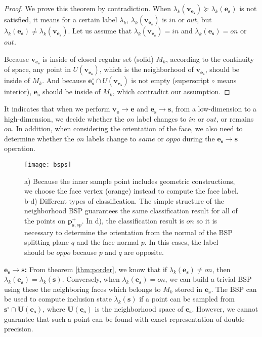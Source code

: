 \begin{proof}
We prove this theorem by contradiction. When $\lambda_k(\bm{v}_{\bm{e}_{\bm{s}}}) \succeq \lambda_k(\bm{e}_{\bm{s}})$ is not satisfied, it means for a certain label $\lambda_k$, $\lambda_k(\bm{v}_{\bm{e}_{\bm{s}}})$ is $in$ or $out$, but $\lambda_k(\bm{e}_{\bm{s}}) \neq \lambda_k(\bm{v}_{\bm{e}_{\bm{s}}})$.
Let us assume that $\lambda_k(\bm{v}_{\bm{e}_{\bm{s}}})=in$ and $\lambda_k(\bm{e}_{\bm{s}})=on$ or $out$.

Because $\bm{v}_{\bm{e}_{\bm{s}}}$ is inside of closed regular set (solid) $M_k$, according to the continuity of space, any point in $U(\bm{v}_{\bm{e}_{\bm{s}}})$, which is the neighborhood of $\bm{v}_{\bm{e}_{\bm{s}}}$, should be inside of $M_k$.
And because $\bm{e}_{\bm{s}}^{\circ}\cap U(\bm{v}_{\bm{e}_{\bm{s}}})$ is not empty (superscript $\circ$ means interior), $\bm{e}_{\bm{s}}$ should be inside of $M_k$, which contradict our assumption.
\end{proof}

It indicates that when we perform $\bm{v}_{\bm{e}}\to \bm{e}$ and $\bm{e}_{\bm{s}}\to \bm{s}$, from a low-dimension to a high-dimension, we decide whether the $on$ label changes to $in$ or $out$, or remains $on$.
In addition, when considering the orientation of the face, we also need to determine whether the $on$ labels change to $same$ or $oppo$ during the $\bm{e}_{\bm{s}}\to \bm{s}$ operation.


\begin{figure}[t]
\centering
\texttt{[image: bsps]}
\caption{a) Because the inner sample point includes geometric constructions, we choose the face vertex (orange) instead to compute the face label. b-d) Different types of classification. The simple structure of the neighborhood BSP guarantees the same classification result for all of the points on $\bm{p}_{\bm{s}, sp}^+$. In d), the classification result is $on$ so it is necessary to determine the orientation from the normal of the BSP splitting plane $q$ and the face normal $p$. In this cases, the label should be $oppo$ because $p$ and $q$ are opposite.}
\label{fig:bsps}
\end{figure}

\vspace{0.5em}
\noindent\textbf{$\bm{\bm{e}_{\bm{s}}\to \bm{s}}$: } From theorem \ref{thm:porder}, we know that if $\lambda_k(\bm{e}_{\bm{s}}) \neq on$, then $\lambda_k(\bm{e}_{\bm{s}})=\lambda_k(\bm{s})$.
Conversely, when $\lambda_k(\bm{e}_{\bm{s}}) = on$, we can build a trivial BSP \cite{thibault1987set} using these the neighboring faces which belongs to $M_k$ stored in $\bm{e}_{\bm{s}}$.
The BSP can be used to compute inclusion state $\lambda_k(\bm{s})$ if a point can be sampled from $\bm{s}^{\circ} \cap \bm{U}(\bm{e}_{\bm{s}})$, where $\bm{U}(\bm{e}_{\bm{s}})$ is the neighborhood space of $\bm{e}_{\bm{s}}$. However, we cannot guarantee that such a point can be found with exact representation of double-precision.

